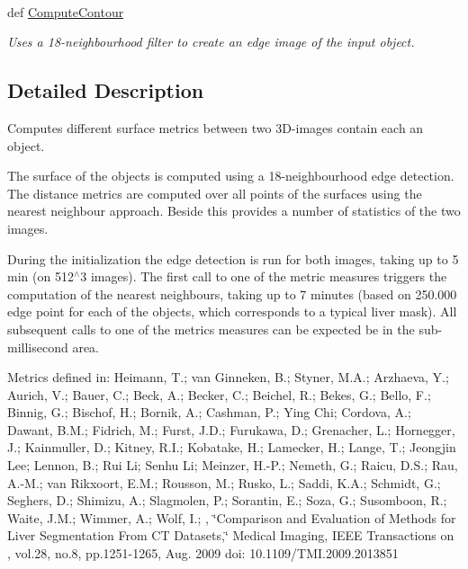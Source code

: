\paragraph*{}
\begin{DoxyCompactItemize}
\item 
def \hyperlink{classmedpy_1_1metric_1_1surface_1_1Surface_af49341603861561734d2f8cb6a612bd1}{ComputeContour}
\begin{DoxyCompactList}\small\item\em Uses a 18-\/neighbourhood filter to create an edge image of the input object. \end{DoxyCompactList}\end{DoxyCompactItemize}



\subsection{Detailed Description}
Computes different surface metrics between two 3D-\/images contain each an object. 

The surface of the objects is computed using a 18-\/neighbourhood edge detection. The distance metrics are computed over all points of the surfaces using the nearest neighbour approach. Beside this provides a number of statistics of the two images.

During the initialization the edge detection is run for both images, taking up to 5 min (on 512$^\wedge$3 images). The first call to one of the metric measures triggers the computation of the nearest neighbours, taking up to 7 minutes (based on 250.000 edge point for each of the objects, which corresponds to a typical liver mask). All subsequent calls to one of the metrics measures can be expected be in the sub-\/millisecond area.

Metrics defined in: Heimann, T.; van Ginneken, B.; Styner, M.A.; Arzhaeva, Y.; Aurich, V.; Bauer, C.; Beck, A.; Becker, C.; Beichel, R.; Bekes, G.; Bello, F.; Binnig, G.; Bischof, H.; Bornik, A.; Cashman, P.; Ying Chi; Cordova, A.; Dawant, B.M.; Fidrich, M.; Furst, J.D.; Furukawa, D.; Grenacher, L.; Hornegger, J.; Kainmuller, D.; Kitney, R.I.; Kobatake, H.; Lamecker, H.; Lange, T.; Jeongjin Lee; Lennon, B.; Rui Li; Senhu Li; Meinzer, H.-\/P.; Nemeth, G.; Raicu, D.S.; Rau, A.-\/M.; van Rikxoort, E.M.; Rousson, M.; Rusko, L.; Saddi, K.A.; Schmidt, G.; Seghers, D.; Shimizu, A.; Slagmolen, P.; Sorantin, E.; Soza, G.; Susomboon, R.; Waite, J.M.; Wimmer, A.; Wolf, I.; , \char`\"{}Comparison and Evaluation of Methods for Liver Segmentation From CT Datasets,\char`\"{} Medical Imaging, IEEE Transactions on , vol.28, no.8, pp.1251-\/1265, Aug. 2009 doi: 10.1109/TMI.2009.2013851 

